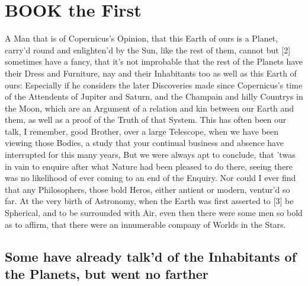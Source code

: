 \documentclass[letterpaper]{book}
\begin{document}
\tableofcontents
\mainmatter

\chapter{BOOK the First}
A Man that is of Copernicus's Opinion, that this Earth of ours is a Planet,
carry'd round and enlighten'd by the Sun, like the rest of them, cannot but
[2] sometimes have a fancy, that it's not improbable that the rest of the
Planets have their Dress and Furniture, nay and their Inhabitants too as
well as this Earth of ours: Especially if he considers the later Discoveries
made since Copernicus's time of the Attendents of Jupiter and Saturn, and
the Champain and hilly Countrys in the Moon, which are an Argument
of a relation and kin between our Earth and them, as well as a proof of
the Truth of that System. This has often been our talk, I remember, good
Brother, over a large Telescope, when we have been viewing those Bodies,
a study that your continual business and absence have interrupted for this
many years, But we were always apt to conclude, that 'twas in vain to
enquire after what Nature had been pleased to do there, seeing there was
no likelihood of ever coming to an end of the Enquiry. Nor could I ever find
that any Philosophers, those bold Heros, either antient or modern, ventur'd
so far. At the very birth of Astronomy, when the Earth was first asserted
to [3] be Spherical, and to be surrounded with Air, even then there were
some men so bold as to affirm, that there were an innumerable company of
Worlds in the Stars.


\section{Some have already talk'd of the Inhabitants of the
Planets, but went no farther}
\end{document}
